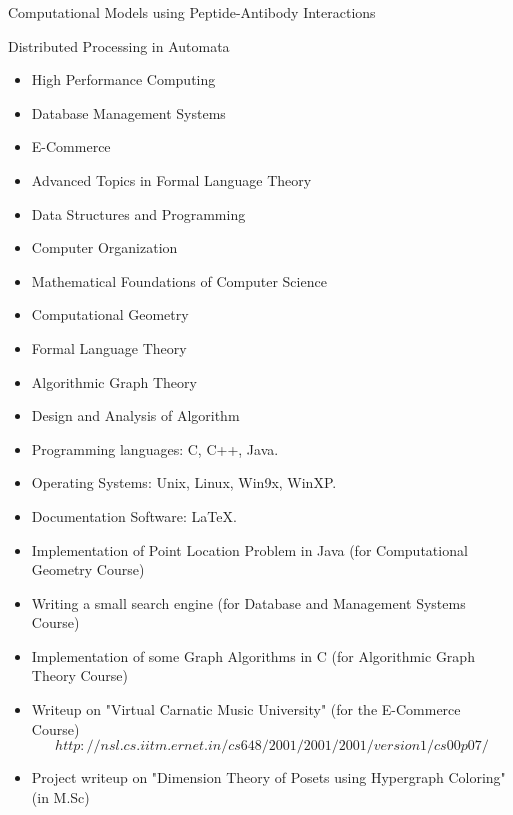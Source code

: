 \documentclass[11pt]{article}
\begin{document}
Computational Models using
Peptide-Antibody Interactions

\vspace{0.4cm}

Distributed Processing in Automata 

\vspace{0.4cm}

\begin{itemize}
\item High Performance Computing
\item Database Management Systems
\item E-Commerce
\item Advanced Topics in Formal Language Theory
\item Data Structures and Programming
\item Computer Organization
\item Mathematical Foundations of Computer Science
\item Computational Geometry
\item Formal Language Theory
\item Algorithmic Graph Theory
\item Design and Analysis of Algorithm
\end{itemize}
\vspace{0.4cm}

\begin{itemize}
\item Programming languages: C, C++, Java.
\item Operating Systems: Unix, Linux, Win9x, WinXP.
\item Documentation Software: \LaTeX .
\end{itemize}

\vspace{0.4cm}

\begin{itemize}
\item Implementation of Point Location Problem in Java (for
    Computational Geometry Course)
\item Writing a small search engine (for Database and Management
    Systems Course)
\item Implementation of some Graph Algorithms in C (for Algorithmic Graph Theory Course)
\item Writeup on "Virtual Carnatic Music University" (for the E-Commerce
    Course)
    \[http://nsl.cs.iitm.ernet.in/cs648/2001/2001/2001/version1/cs00p07/\]
\item Project writeup on "Dimension Theory of Posets using Hypergraph
    Coloring" (in M.Sc)
\end{itemize}
\end{document}
